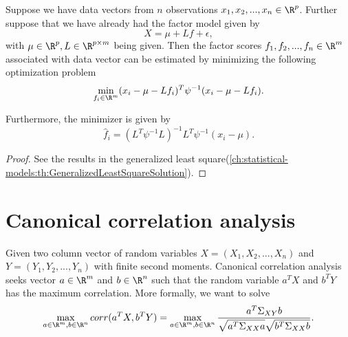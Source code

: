 \begin{refsection}
\begin{lemma}
Suppose we have data vectors from $n$ observations $x_1,x_2,...,x_n \in \R^p$. Further suppose that we have already had the factor model given by
$$X = \mu + Lf + \epsilon,$$
with $\mu\in \R^p, L\in \R^{p\times m}$ being given.
Then the factor scores $f_1,f_2,...,f_n \in \R^m$ associated with data vector can be estimated by minimizing the following optimization problem
$$\min_{f_i\in\R^m} (x_i - \mu - Lf_i)^T\psi^{-1}(x_i - \mu - Lf_i).$$

Furthermore, the minimizer is given by
$$\hat{f}_i = (L^T\psi^{-1}L)^{-1}L^T\psi^{-1}(x_i-\mu).$$
\end{lemma}
\begin{proof}
See the results in the generalized least square(\autoref{ch:statistical-models:th:GeneralizedLeastSquareSolution}).	
\end{proof}

\section{Canonical correlation analysis}

\begin{definition}
Given two column vector of random variables $X = (X_1,X_2,...,X_n)$ and $Y = (Y_1,Y_2,...,Y_n)$ with finite second moments. Canonical correlation analysis seeks vector $a\in \R^m$ and $b\in \R^n$ such that the random variable $a^TX$ and $b^TY$ has the maximum correlation. More formally, we want to solve
$$\max_{a\in \R^m, b\in \R^n} corr(a^TX, b^TY) = \max_{a\in \R^m, b\in \R^n} \frac{a^T\Sigma_{XY}b}{\sqrt{a^T\Sigma_{XX}a}\sqrt{b^T\Sigma_{XX}b}}.$$	
\end{definition}



\end{refsection}
